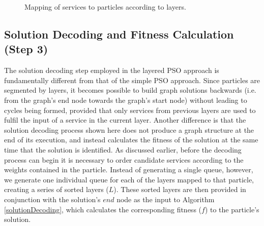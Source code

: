 \documentclass{llncs}
\begin{document}
\begin{figure}[h]
\centerline{
}
 \caption{Mapping of services to particles according to layers.}
 \label{layeredMapping}
\end{figure}

\subsection{Solution Decoding and Fitness Calculation (Step 3)}

The solution decoding step employed in the layered PSO approach is fundamentally different from that of the simple PSO approach. Since particles are segmented by layers, it becomes possible to build graph solutions backwards (i.e. from the graph's end node towards the graph's start node) without leading to cycles being formed, provided that only services from previous layers are used to fulfil the input of a service in the current layer. Another difference is that the solution decoding process shown here does not produce a graph structure at the end of its execution, and instead calculates the fitness of the solution at the same time that the solution is identified. As discussed earlier, before the decoding process can begin it is necessary to order candidate services according to the weights contained in the particle. Instead of generating a single queue, however, we generate one individual queue for each of the layers mapped to that particle, creating a series of sorted layers ($L$). These sorted layers are then provided in conjunction with the solution's $end$ node as the input to Algorithm \ref{solutionDecoding}, which calculates the corresponding fitness ($f$) to the particle's solution.
\end{document}
